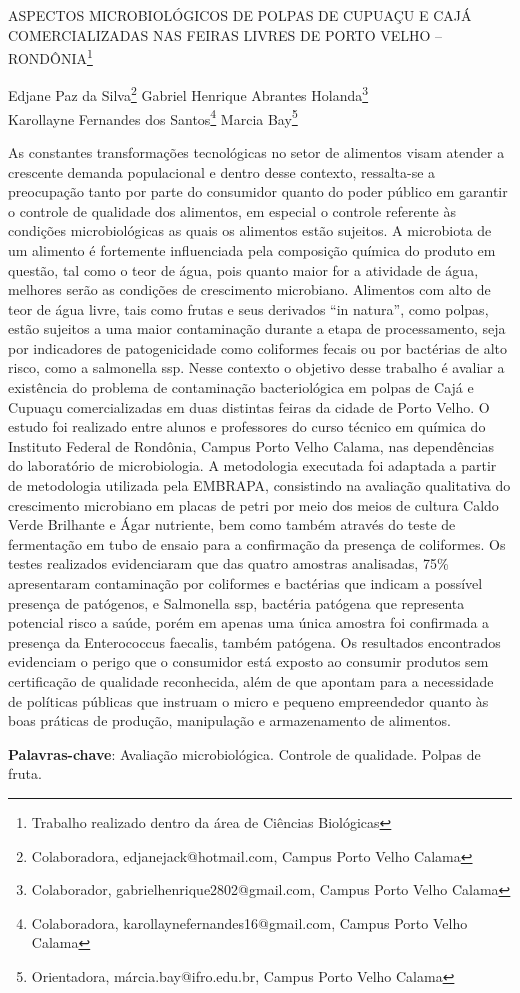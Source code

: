 \documentclass[article,12pt,onesidea,4paper,english,brazil]{abntex2}
\begin{document}
	
	
	\frenchspacing 
	
	\begin{center}
		\LARGE ASPECTOS MICROBIOLÓGICOS DE POLPAS DE CUPUAÇU E CAJÁ
		COMERCIALIZADAS NAS FEIRAS LIVRES DE PORTO VELHO -- RONDÔNIA\footnote{Trabalho realizado dentro da área de Ciências Biológicas}
		
		\normalsize
		Edjane Paz da Silva\footnote{Colaboradora, edjanejack@hotmail.com, Campus Porto Velho Calama} 
		Gabriel Henrique Abrantes Holanda\footnote{Colaborador, gabrielhenrique2802@gmail.com, Campus Porto Velho Calama} \\
		Karollayne Fernandes dos Santos\footnote{Colaboradora, karollaynefernandes16@gmail.com, Campus Porto Velho Calama} 
		Marcia Bay\footnote{Orientadora, márcia.bay@ifro.edu.br, Campus Porto Velho Calama} 
	\end{center}
	
	\noindent As constantes transformações tecnológicas no setor de alimentos visam atender a
	crescente demanda populacional e dentro desse contexto, ressalta-se a
	preocupação tanto por parte do consumidor quanto do poder público em garantir o
	controle de qualidade dos alimentos, em especial o controle referente às condições
	microbiológicas as quais os alimentos estão sujeitos. A microbiota de um alimento é
	fortemente influenciada pela composição química do produto em questão, tal como o
	teor de água, pois quanto maior for a atividade de água, melhores serão as
	condições de crescimento microbiano. Alimentos com alto de teor de água livre, tais
	como frutas e seus derivados “in natura”, como polpas, estão sujeitos a uma maior
	contaminação durante a etapa de processamento, seja por indicadores de
	patogenicidade como coliformes fecais ou por bactérias de alto risco, como a
	salmonella ssp. Nesse contexto o objetivo desse trabalho é avaliar a existência do
	problema de contaminação bacteriológica em polpas de Cajá e Cupuaçu
	comercializadas em duas distintas feiras da cidade de Porto Velho. O estudo foi
	realizado entre alunos e professores do curso técnico em química do Instituto
	Federal de Rondônia, Campus Porto Velho Calama, nas dependências do
	laboratório de microbiologia. A metodologia executada foi adaptada a partir de
	metodologia utilizada pela EMBRAPA, consistindo na avaliação qualitativa do
	crescimento microbiano em placas de petri por meio dos meios de cultura Caldo
	Verde Brilhante e Ágar nutriente, bem como também através do teste de
	fermentação em tubo de ensaio para a confirmação da presença de coliformes. Os
	testes realizados evidenciaram que das quatro amostras analisadas, 75\%
	apresentaram contaminação por coliformes e bactérias que indicam a possível
	presença de patógenos, e Salmonella ssp, bactéria patógena que representa
	potencial risco a saúde, porém em apenas uma única amostra foi confirmada a
	presença da Enterococcus faecalis, também patógena. Os resultados encontrados
	evidenciam o perigo que o consumidor está exposto ao consumir produtos sem
	certificação de qualidade reconhecida, além de que apontam para a necessidade de
	políticas públicas que instruam o micro e pequeno empreendedor quanto às boas
	práticas de produção, manipulação e armazenamento de alimentos.
	
	\vspace{\onelineskip}
	
	\noindent
	\textbf{Palavras-chave}: Avaliação microbiológica. Controle de qualidade. Polpas de fruta.
	
\end{document}
